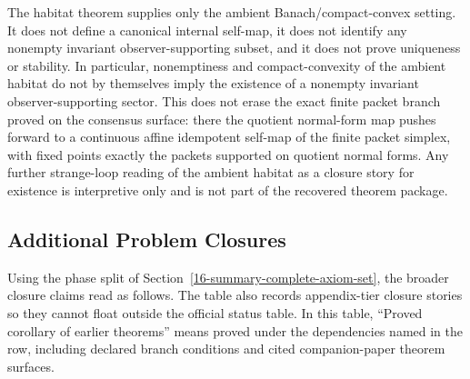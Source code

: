 The habitat theorem supplies only the ambient Banach/compact-convex setting. It does not define a
canonical internal self-map, it does not identify any nonempty invariant observer-supporting subset,
and it does not prove uniqueness or stability. In particular, nonemptiness and compact-convexity
of the ambient habitat do not by themselves imply the existence of a nonempty invariant
observer-supporting sector. This does not erase the exact finite packet branch proved on the
consensus surface: there the quotient normal-form map pushes forward to a continuous
affine idempotent self-map of the finite packet simplex, with fixed points exactly the packets
supported on quotient normal forms. Any further strange-loop reading of the ambient habitat as a
closure story for existence is interpretive only and is not part of the recovered theorem package.

\subsection{Additional Problem Closures}

Using the phase split of Section~\ref{16-summary-complete-axiom-set}, the broader closure claims
read as follows. The table also records appendix-tier closure stories so they cannot float
outside the official status table. In this table, ``Proved corollary of earlier theorems'' means
proved under the dependencies named in the row, including declared branch conditions and cited
companion-paper theorem surfaces.

